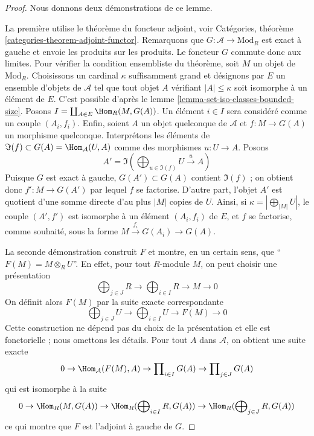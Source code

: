 \begin{proof}
Nous donnons deux démonstrations de ce lemme.

\medskip\noindent
La première utilise le théorème du foncteur adjoint, voir Catégories,
théorème \ref{categories-theorem-adjoint-functor}. Remarquons que
$G : \mathcal{A} \to \text{Mod}_R$ est exact à gauche et envoie les produits
sur les produits. Le foncteur $G$ commute donc aux limites. Pour vérifier la condition
ensembliste du théorème, soit $M$ un objet de $\text{Mod}_R$. Choisissons un
cardinal $\kappa$ suffisamment grand et désignons par $E$ un ensemble d'objets
de $\mathcal{A}$ tel que tout objet $A$ vérifiant $|A| \leq \kappa$ soit
isomorphe à un élément de $E$. C'est possible d'après le lemme
\ref{lemma-set-iso-classes-bounded-size}. Posons
$I = \coprod_{A \in E} \Hom_R(M, G(A))$. Un élément $i \in I$ sera considéré
comme un couple $(A_i, f_i)$. Enfin, soient $A$ un objet quelconque de
$\mathcal{A}$ et $f : M \to G(A)$ un morphisme quelconque. Interprétons les
éléments de $\Im(f) \subset G(A) = \Hom_\mathcal{A}(U, A)$ comme des
morphismes $u : U \to A$. Posons
$$
A' = \Im(\bigoplus\nolimits_{u \in \Im(f)} U \xrightarrow{u} A)
$$
Puisque $G$ est exact à gauche, $G(A') \subset G(A)$ contient $\Im(f)$ ; on
obtient donc $f' : M \to G(A')$ par lequel $f$ se factorise. D'autre part,
l'objet $A'$ est quotient d'une somme directe d'au plus $|M|$ copies de $U$.
Ainsi, si $\kappa = |\bigoplus_{|M|} U|$, le couple $(A', f')$ est isomorphe
à un élément $(A_i, f_i)$ de $E$, et $f$ se factorise, comme souhaité, sous
la forme $M \xrightarrow{f_i} G(A_i) \to G(A)$.

\medskip\noindent
La seconde démonstration construit $F$ et montre, en un certain sens, que
``$F(M) = M \otimes_R U$''. En effet, pour tout $R$-module $M$, on peut
choisir une présentation
$$
\bigoplus\nolimits_{j \in J} R \to
\bigoplus\nolimits_{i \in I} R \to
M \to 0
$$
On définit alors $F(M)$ par la suite exacte correspondante
$$
\bigoplus\nolimits_{j \in J} U \to
\bigoplus\nolimits_{i \in I} U \to
F(M) \to 0
$$
Cette construction ne dépend pas du choix de la présentation et elle est
fonctorielle ; nous omettons les détails. Pour tout $A$ dans $\mathcal{A}$,
on obtient une suite exacte
$$
0 \to \Hom_\mathcal{A}(F(M), A) \to
\prod\nolimits_{i \in I} G(A) \to
\prod\nolimits_{j \in J} G(A)
$$
qui est isomorphe à la suite
$$
0 \to \Hom_R(M, G(A)) \to
\Hom_R(\bigoplus\nolimits_{i \in I} R, G(A)) \to
\Hom_R(\bigoplus\nolimits_{j \in J} R, G(A))
$$
ce qui montre que $F$ est l'adjoint à gauche de $G$.
\end{proof}

